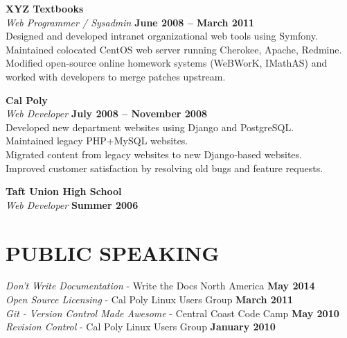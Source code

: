 \documentclass[margin,line]{resume}
\begin{document}
\begin{resume}
    \textbf{\listing XYZ Textbooks} \vspace{2mm}\\\vspace{1mm}%
    \textsl{Web Programmer / Sysadmin} \hfill \textbf{June 2008 -- March 2011}\\
    Designed and developed intranet organizational web tools using Symfony.\\
    Maintained colocated CentOS web server running Cherokee, Apache, Redmine.\\
    Modified open-source online homework systems (WeBWorK, IMathAS) and worked with developers to merge patches upstream.
    
    \textbf{\listing Cal Poly} \vspace{2mm}\\\vspace{1mm}%
    \textsl{Web Developer} \hfill \textbf{July 2008 -- November 2008}\\
    Developed new department websites using Django and PostgreSQL.\\
    Maintained legacy PHP+MySQL websites.\\
    Migrated content from legacy websites to new Django-based websites.\\
    Improved customer satisfaction by resolving old bugs and feature requests.

    \textbf{\listing Taft Union High School} \vspace{2mm}\\\vspace{1mm}%
    \textsl{Web Developer} \hfill \textbf{Summer 2006}\\

\sectionline

    \section{\mysidestyle \textbf{\large{P}\small{UBLIC SPEAKING}}}

    \textsl{Don't Write Documentation} - Write the Docs North America \hfill \textbf{May 2014}\\
    \textsl{Open Source Licensing} - Cal Poly Linux Users Group \hfill \textbf{March 2011}\\
    \textsl{Git - Version Control Made Awesome} - Central Coast Code Camp \hfill \textbf{May 2010}\\
    \textsl{Revision Control} - Cal Poly Linux Users Group \hfill \textbf{January 2010}\\


\end{resume}
\end{document}
